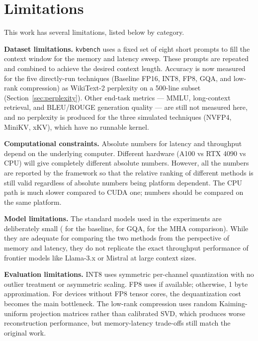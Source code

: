 \documentclass[conference]{IEEEtran}
\begin{document}
\section{Limitations}
\label{sec:limitations}
{\sloppy
This work has several limitations, listed below by category. 

\noindent\textbf{Dataset limitations.} \texttt{kvbench} uses a fixed set of eight short prompts to fill the context window for the memory and latency sweep. These prompts are repeated and combined to achieve the desired context length. Accuracy is now measured for the five directly-run techniques (Baseline FP16, INT8, FP8, GQA, and low-rank compression) as WikiText-2 perplexity on a 500-line subset (Section~\ref{sec:perplexity}). Other end-task metrics --- MMLU, long-context retrieval, and BLEU/ROUGE generation quality --- are still not measured here, and no perplexity is produced for the three simulated techniques (NVFP4, MiniKV, xKV), which have no runnable kernel.

\noindent\textbf{Computational constraints.} Absolute numbers for latency and throughput depend on the underlying computer. Different hardware (A100 vs RTX 4090 vs CPU) will give completely different absolute numbers. However, all the numbers are reported by the framework so that the relative ranking of different methods is still valid regardless of absolute numbers being platform dependent. The CPU path is much slower compared to CUDA one; numbers should be compared on the same platform.

\noindent\textbf{Model limitations.} The standard models used in the experiments are deliberately small ( for the baseline,  for GQA,  for the MHA comparison). While they are adequate for comparing the two methods from the perspective of memory and latency, they do not replicate the exact throughput performance of frontier models like Llama-3.x or Mistral at large context sizes.

\noindent\textbf{Evaluation limitations.} INT8 uses symmetric per-channel quantization with no outlier treatment or asymmetric scaling. FP8 uses  if available; otherwise, 1 byte approximation. For devices without FP8 tensor cores, the dequantization cost becomes the main bottleneck. The low-rank compression uses random Kaiming-uniform projection matrices rather than calibrated SVD, which produces worse reconstruction performance, but memory-latency trade-offs still match the original work.

}
\end{document}
